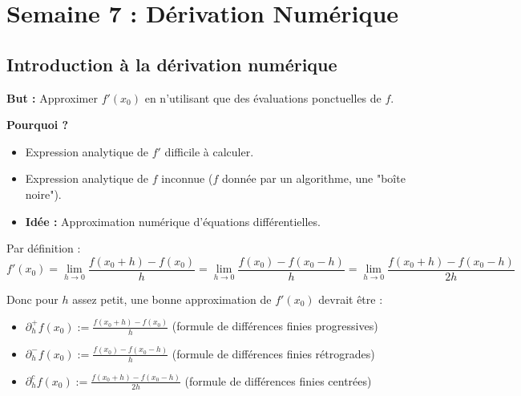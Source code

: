 \section{Semaine 7 : Dérivation Numérique}

\subsection{Introduction à la dérivation numérique}

\textbf{But :} Approximer $f'(x_0)$ en n'utilisant que des évaluations ponctuelles de $f$.

\textbf{Pourquoi ?}
\begin{itemize}
    \item Expression analytique de $f'$ difficile à calculer.
    \item Expression analytique de $f$ inconnue ($f$ donnée par un algorithme, une "boîte noire").
    \item \textbf{Idée :} Approximation numérique d'équations différentielles.
\end{itemize}

Par définition :
$$f'(x_0) = \lim_{h \to 0} \frac{f(x_0+h)-f(x_0)}{h} = \lim_{h \to 0} \frac{f(x_0)-f(x_0-h)}{h} = \lim_{h \to 0} \frac{f(x_0+h)-f(x_0-h)}{2h}$$

Donc pour $h$ assez petit, une bonne approximation de $f'(x_0)$ devrait être :
\begin{definition}
\begin{itemize}
    \item $\partial_h^+ f(x_0) := \frac{f(x_0+h)-f(x_0)}{h}$ \quad (formule de différences finies progressives)
    \item $\partial_h^- f(x_0) := \frac{f(x_0)-f(x_0-h)}{h}$ \quad (formule de différences finies rétrogrades)
    \item $\partial_h^c f(x_0) := \frac{f(x_0+h)-f(x_0-h)}{2h}$ \quad (formule de différences finies centrées)
\end{itemize}
\end{definition}

